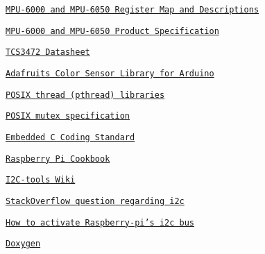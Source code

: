 \begin{DoxyItemize}
\item \href{https://invensense.tdk.com/wp-content/uploads/2015/02/MPU-6000-Register-Map1.pdf}{\tt M\+P\+U-\/6000 and M\+P\+U-\/6050 Register Map and Descriptions}
\item \href{https://invensense.tdk.com/wp-content/uploads/2015/02/MPU-6000-Datasheet1.pdf}{\tt M\+P\+U-\/6000 and M\+P\+U-\/6050 Product Specification}
\item \href{https://cdn-shop.adafruit.com/datasheets/TCS34725.pdf}{\tt T\+C\+S3472 Datasheet}
\item \href{https://github.com/adafruit/Adafruit_TCS34725}{\tt Adafruit\textquotesingle{}s Color Sensor Library for Arduino}
\item \href{https://www.cs.cmu.edu/afs/cs/academic/class/15492-f07/www/pthreads.html}{\tt P\+O\+S\+IX thread (pthread) libraries}
\item \href{https://pubs.opengroup.org/onlinepubs/9699919799/functions/pthread_mutex_lock.html}{\tt P\+O\+S\+IX mutex specification}
\item \href{https://barrgroup.com/embedded-systems/books/embedded-c-coding-standard}{\tt Embedded C Coding Standard}
\item \href{https://books.google.es/books?id=T0JRAgAAQBAJ&printsec=frontcover&hl=es#v=onepage&q&f=false}{\tt Raspberry Pi Cookbook}
\item \href{https://www.mankier.com/package/i2c-tools}{\tt I2\+C-\/tools Wiki}
\item \href{https://stackoverflow.com/questions/52975817/setup-i2c-reading-and-writing-in-c-language}{\tt Stack\+Overflow question regarding i2c}
\item \href{https://openest.io/en/services/activate-raspberry-pi-4-i2c-bus/}{\tt How to activate Raspberry-\/pi’s i2c bus}
\item \href{https://www.doxygen.nl/index.html}{\tt Doxygen} 
\end{DoxyItemize}
